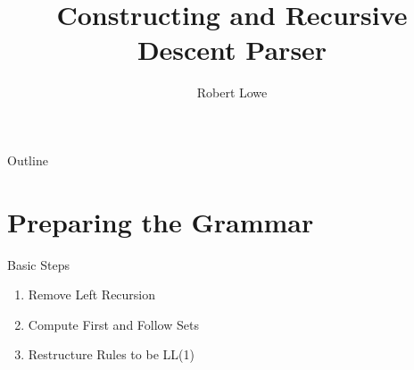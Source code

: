 \documentclass[handout]{beamer}
\title{Constructing and Recursive Descent Parser}
\author{Robert Lowe}
\institute[Southeast Missouri State University] %
{
  Department of Computer Science\\
  Southeast Missouri State University
}
\date[]{}
\begin{document}
\begin{frame}
  \titlepage
\end{frame}

\begin{frame}{Outline}
  \tableofcontents
\end{frame}




\section{Preparing the Grammar}
\begin{frame}{Basic Steps}
    \begin{enumerate}
        \item Remove Left Recursion
        \item Compute First and Follow Sets
        \item Restructure Rules to be LL(1)
    \end{enumerate}
\end{frame}
\end{document}
